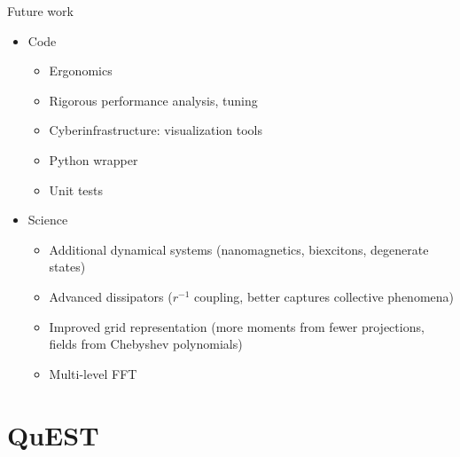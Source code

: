 \documentclass[aspectratio=169, usenames, dvipsnames]{beamer}
\begin{document}
\begin{frame}{Future work}
  \begin{itemize}
    \item[] Code
      \begin{itemize}
        \item Ergonomics
        \item Rigorous performance analysis, tuning
        \item Cyberinfrastructure: visualization tools
        \item Python wrapper
        \item Unit tests
      \end{itemize}

    \item[] Science
      \begin{itemize}
        \item Additional dynamical systems (nanomagnetics, biexcitons, degenerate states)
        \item Advanced dissipators ($r^{-1}$ coupling, better captures collective phenomena)
        \item Improved grid representation (more moments from fewer projections, fields from Chebyshev polynomials)
        \item Multi-level FFT
      \end{itemize}
  \end{itemize}
\end{frame}

\section{QuEST}
\end{document}
